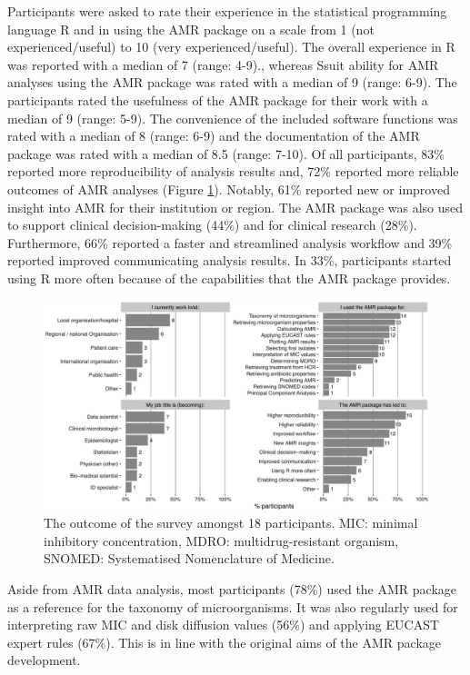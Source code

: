 \documentclass[
]{book}
\begin{document}
Participants were asked to rate their experience in the statistical programming language R and in using the AMR package on a scale from 1 (not experienced/useful) to 10 (very experienced/useful). The overall experience in R was reported with a median of 7 (range: 4-9)., whereas Ssuit ability for AMR analyses using the AMR package was rated with a median of 9 (range: 6-9). The participants rated the usefulness of the AMR package for their work with a median of 9 (range: 5-9). The convenience of the included software functions was rated with a median of 8 (range: 6-9) and the documentation of the AMR package was rated with a median of 8.5 (range: 7-10). Of all participants, 83\% reported more reproducibility of analysis results and, 72\% reported more reliable outcomes of AMR analyses (Figure \ref{fig:fig3-2}). Notably, 61\% reported new or improved insight into AMR for their institution or region. The AMR package was also used to support clinical decision-making (44\%) and for clinical research (28\%). Furthermore, 66\% reported a faster and streamlined analysis workflow and 39\% reported improved communicating analysis results. In 33\%, participants started using R more often because of the capabilities that the AMR package provides.

\begin{figure}

{\centering \includegraphics[width=1\linewidth]{images/03-02} 

}

\caption{The outcome of the survey amongst 18 participants. MIC: minimal inhibitory concentration, MDRO: multidrug-resistant organism, SNOMED: Systematised Nomenclature of Medicine.}\label{fig:fig3-2}
\end{figure}

Aside from AMR data analysis, most participants (78\%) used the AMR package as a reference for the taxonomy of microorganisms. It was also regularly used for interpreting raw MIC and disk diffusion values (56\%) and applying EUCAST expert rules (67\%). This is in line with the original aims of the AMR package development.
\end{document}
